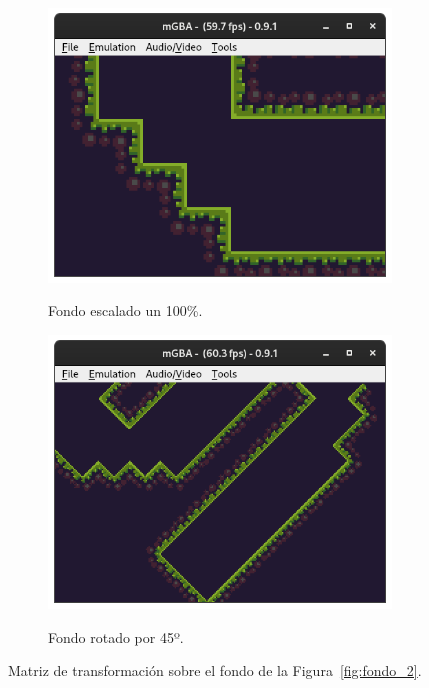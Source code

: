 \begin{figure}[h]
     \centering
     \begin{subfigure}[b]{0.45\textwidth}
         \centering
         \includegraphics[width=\textwidth]{capitulos/capitulo3/affine_bg_2.png}
         \label{fig:fondo_3}
	     \caption{Fondo escalado un 100\%.}
     \end{subfigure}
     \hfill
     \begin{subfigure}[b]{0.45\textwidth}
         \centering
         \includegraphics[width=\textwidth]{capitulos/capitulo3/affine_bg_3.png}
         \label{fig:fondo_4}
	     \caption{Fondo rotado por 45º.}
     \end{subfigure}
	\caption{Matriz de transformación sobre el fondo de la Figura~\ref{fig:fondo_2}.}\label{fig:fondos_aff}
\end{figure}
\FloatBarrier{}

